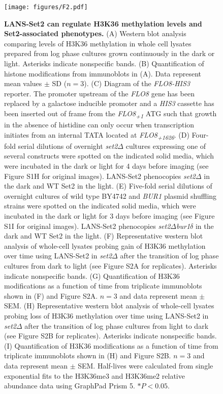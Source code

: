 \documentclass[12pt]{biorxiv}
\begin{document}
\begin{spacing}{2}
\begin{figure}
\center
\texttt{[image: figures/F2.pdf]}
\caption{\textbf{LANS-Set2 can regulate H3K36 methylation levels and Set2-associated phenotypes.} (A) Western blot analysis comparing levels of H3K36 methylation in whole cell lysates prepared from log phase cultures grown continuously in the dark or light. Asterisks indicate nonspecific bands. (B) Quantification of histone modifications from immunoblots in (A). Data represent mean values $\pm$ SD ($n = 3$). (C) Diagram of the \textit{FLO8-HIS3} reporter. The promoter upstream of the \textit{FLO8} gene has been replaced by a galactose inducible promoter and a \textit{HIS3} cassette has been inserted out of frame from the \textit{FLO8}\textsubscript{\textit{+1}} ATG such that growth in the absence of histidine can only occur when transcription initiates from an internal TATA located at \textit{FLO8}\textsubscript{\textit{+1626}}. (D) Four-fold serial dilutions of overnight \textit{set2$\Delta$} cultures expressing one of several constructs were spotted on the indicated solid media, which were incubated in the dark or light for 4 days before imaging (see Figure S1H for original images). LANS-Set2 phenocopies \textit{set2$\Delta$} in the dark and WT Set2 in the light. (E) Five-fold serial dilutions of overnight cultures of wild type BY4742 and \textit{BUR1} plasmid shuffling strains were spotted on the indicated solid media, which were incubated in the dark or light for 3 days before imaging (see Figure S1I for original images). LANS-Set2 phenocopies \textit{set2$\Delta$bur1$\delta$} in the dark and WT Set2 in the light. (F) Representative western blot analysis of whole-cell lysates probing gain of H3K36 methylation over time using LANS-Set2 in \textit{set2$\Delta$} after the transition of log phase cultures from dark to light (see Figure S2A for replicates). Asterisks indicate nonspecific bands. (G) Quantification of H3K36 modifications as a function of time from triplicate immunoblots shown in (F) and Figure S2A. $n = 3$ and data represent mean $\pm$ SEM.  (H) Representative western blot analysis of whole-cell lysates probing loss of H3K36 methylation over time using LANS-Set2 in \textit{set2$\Delta$} after the transition of log phase cultures from light to dark (see Figure S2B for replicates). Asterisks indicate nonspecific bands. (I) Quantification of H3K36 modifications as a function of time from triplicate immunoblots shown in (H) and Figure S2B. $n = 3$ and data represent mean $\pm$ SEM.  Half-lives were calculated from single exponential fits to the H3K36me3 and H3K36me2 relative abundance data using GraphPad Prism 5. $\ast P < 0.05$.}
\end{figure}



%
%
%
%




\end{spacing}


%
%
%
%
\newpage


\end{document}
